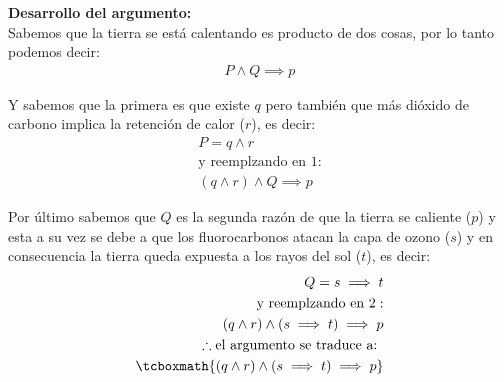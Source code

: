 \documentclass[10pt,letterpaper]{article}
\begin{document}
\begin{enumerate}
\begin{enumerate}
            \medskip

            \textbf{Desarrollo del argumento:} \\
            Sabemos que la tierra se está calentando es producto de dos cosas,
            por lo tanto podemos decir:
                \begin{equation} \begin{split}
                    P \land Q \implies p
                \end{split} \end{equation}

            Y sabemos que la primera es que existe $q$ pero también que más dióxido
            de carbono implica la retención de calor ($r$), es decir:
                \begin{equation} \begin{split}
                    P = q \land r \\
                    \text{y reemplzando en 1}: \\
                    (q \land r) \land Q \implies p
                \end{split} \end{equation}

            Por último sabemos que $Q$ es la segunda razón de que la tierra se caliente
            ($p$) y esta a su vez se debe a que los fluorocarbonos atacan la capa de ozono
            ($s$) y en consecuencia la tierra queda expuesta a los rayos del sol ($t$), es decir:
                \begin{equation} \begin{split}
                    Q = s \implies t \\
                    \text{y reemplzando en 2}: \\
                    (q \land r) \land (s \implies t) \implies p \\
                    \therefore \text{el argumento se traduce a: } \\
                    \tcboxmath{(q \land r) \land (s \implies t) \implies p}
                \end{split} \end{equation}
        \end{enumerate}
\end{enumerate}
\end{document}
